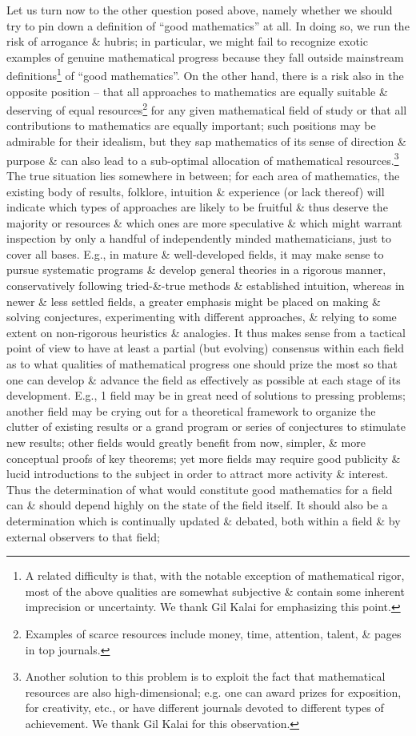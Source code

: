\documentclass[oneside]{book}
\numberwithin{equation}{section}
\begin{document}
Let us turn now to the other question posed above, namely whether we should try to pin down a definition of ``good mathematics'' at all. In doing so, we run the risk of arrogance \& hubris; in particular, we might fail to recognize exotic examples of genuine mathematical progress because they fall outside mainstream definitions\footnote{A related difficulty is that, with the notable exception of mathematical rigor, most of the above qualities are somewhat subjective \& contain some inherent imprecision or uncertainty. We thank Gil Kalai for emphasizing this point.} of ``good mathematics''. On the other hand, there is a risk also in the opposite position -- that all approaches to mathematics are equally suitable \& deserving of equal resources\footnote{Examples of scarce resources include money, time, attention, talent, \& pages in top journals.} for any given mathematical field of study or that all contributions to mathematics are equally important; such positions may be admirable for their idealism, but they sap mathematics of its sense of direction \& purpose \& can also lead to a sub-optimal allocation of mathematical resources.\footnote{Another solution to this problem is to exploit the fact that mathematical resources are also high-dimensional; e.g. one can award prizes for exposition, for creativity, etc., or have different journals devoted to different types of achievement. We thank Gil Kalai for this observation.} The true situation lies somewhere in between; for each area of mathematics, the existing body of results, folklore, intuition \& experience (or lack thereof) will indicate which types of approaches are likely to be fruitful \& thus deserve the majority or resources \& which ones are more speculative \& which might warrant inspection by only a handful of independently minded mathematicians, just to cover all bases. E.g., in mature \& well-developed fields, it may make sense to pursue systematic programs \& develop general theories in a rigorous manner, conservatively following tried-\&-true methods \& established intuition, whereas in newer \& less settled fields, a greater emphasis might be placed on making \& solving conjectures, experimenting with different approaches, \& relying to some extent on non-rigorous heuristics \& analogies. It thus makes sense from a tactical point of view to have at least a partial (but evolving) consensus within each field as to what qualities of mathematical progress one should prize the most so that one can develop \& advance the field as effectively as possible at each stage of its development. E.g., 1 field may be in great need of solutions to pressing problems; another field may be crying out for a theoretical framework to organize the clutter of existing results or a grand program or series of conjectures to stimulate new results; other fields would greatly benefit from now, simpler, \& more conceptual proofs of key theorems; yet more fields may require good publicity \& lucid introductions to the subject in order to attract more activity \& interest. Thus the determination of what would constitute good mathematics for a field can \& should depend highly on the state of the field itself. It should also be a determination which is continually updated \& debated, both within a field \& by external observers to that field; 
\end{document}
